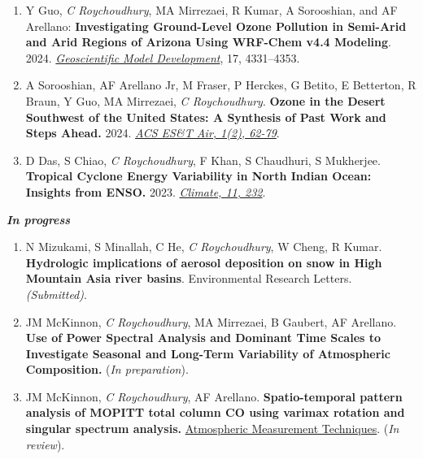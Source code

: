 \documentclass[margin,line]{resume}
\begin{document}
\begin{resume}
\begin{enumerate}[topsep=1pt, partopsep=1pt, itemsep=0.5pt, parsep=0.1pt, leftmargin=15pt,label=\arabic*.]
			\item Y Guo, \textit{C Roychoudhury}, MA Mirrezaei, R Kumar, A Sorooshian, and AF Arellano: \textbf{Investigating Ground-Level Ozone Pollution in Semi-Arid and Arid Regions of Arizona Using WRF-Chem v4.4 Modeling}. 2024.
			\href{ https://doi.org/10.5194/gmd-17-4331-2024}{\textit{Geoscientific Model Development}},  17, 4331–4353.
			
			\item A Sorooshian, AF Arellano Jr, M Fraser, P Herckes, G Betito, E Betterton, R Braun, Y Guo, MA Mirrezaei, \textit{C Roychoudhury}. \textbf{Ozone in the Desert Southwest of the United States: A Synthesis of Past Work and Steps Ahead.} 2024.  \href{https://doi.org/10.1021/acsestair.3c00033}{\textit{ACS ES\&T Air, 1(2), 62-79}}.
			
			\item D Das, S Chiao, \textit{C Roychoudhury}, F Khan, S Chaudhuri, S Mukherjee. \textbf{Tropical Cyclone Energy Variability in North Indian Ocean: Insights from ENSO.} 2023.
			\href{https://www.mdpi.com/2225-1154/11/12/232}{\textit{Climate, 11, 232}}.
			
		\end{enumerate}
		
		\textbf{\emph{\textcolor{sep}{\textbf{In progress}}}}
		\begin{enumerate}[topsep=1pt, partopsep=1pt, itemsep=0.5pt, parsep=0.1pt, leftmargin=15pt,label=\arabic*.]
			
			\item N Mizukami, S Minallah, C He, \textit{C Roychoudhury}, W Cheng, R Kumar. \textbf{Hydrologic implications of aerosol deposition on snow in High
				Mountain Asia river basins}. Environmental Research Letters. \textit{(Submitted)}.
			
			\item JM McKinnon, \textit{C Roychoudhury}, MA Mirrezaei, B Gaubert, AF Arellano.  \textbf{Use of Power Spectral Analysis and Dominant Time Scales to
				Investigate Seasonal and Long-Term Variability of Atmospheric
				Composition.} (\textit{In preparation}).
			
			\item JM McKinnon, \textit{C Roychoudhury}, AF Arellano. \textbf{Spatio-temporal pattern analysis of MOPITT total column CO using varimax rotation and singular spectrum analysis.} \href{https://egusphere.copernicus.org/preprints/2025/egusphere-2024-3440}{Atmospheric Measurement Techniques}. (\textit{In review}).
			

\end{enumerate}
\end{resume}
\end{document}
